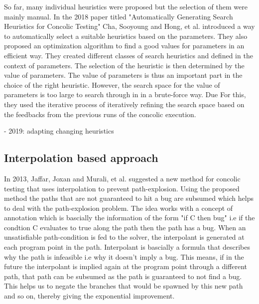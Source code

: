 \documentclass[	runningheads,
				a4paper]{llncs}
\begin{document}
So far, many individual heuristics were proposed but the selection of them were mainly manual. In the 2018 paper titled "Automatically Generating Search Heuristics for Concolic Testing" \cite{cha2018automatically} Cha, Sooyoung and Hong, et al. introduced a way to automatically select a suitable heuristics based on the parameters. They also proposed an optimization algorithm to find a good values for parameters in an efficient way. They created different classes of search heuristics and defined in the context of parameters. The selection of the heuristic is then determined by the value of parameters. The value of parameters is thus an important part in the choice of the right heuristic. However, the search space for the value of parameters is too large to search through in in a brute-force way. Due For this, they used the iterative process of iteratively refining the search space based on the feedbacks from the previous runs of the concolic execution. 

- 2019: adapting changing heuristics


\subsection{Interpolation based approach}
In 2013, Jaffar, Joxan and Murali, et al. suggested a new method \cite{jaffar2013boosting} for concolic testing that uses interpolation to prevent path-explosion. Using the proposed method the paths that are not guaranteed to hit a bug are subsumed which helps to deal with the path-explosion problem. The idea works with a concept of annotation which is bascially the  information of the form "if C then bug" i.e if the condtion C evaluates to true along the path then the path has a bug. When an unsatisfiable path-condition is fed to the solver, the interpolant is generated at each program point in the path. Interpolant is bascially a formula that describes why the path is infeasible i.e why it doesn't imply a bug. This means, if in the future the interpolant is implied again at the program point through a different path, that path can be subsumed as the path is guaranteed to not find a bug. This helps us to negate the branches that would be spawned by this new path and so on, thereby giving the exponential improvement.
\end{document}
